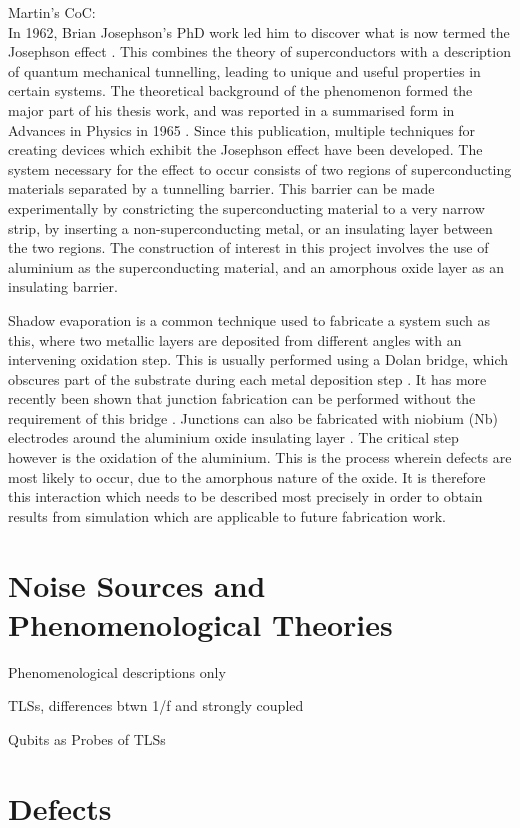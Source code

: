 Martin's CoC:\\
In 1962, Brian Josephson’s PhD work led him to discover what is now termed the Josephson effect \cite{Josephson1962}.
This combines the theory of superconductors with a description of quantum mechanical tunnelling, leading to unique and useful properties in certain systems.
The theoretical background of the phenomenon formed the major part of his thesis work, and was reported in a summarised form in Advances in Physics in 1965 \cite{Josephson1965}.
Since this publication, multiple techniques for creating devices which exhibit the Josephson effect have been developed.
The system necessary for the effect to occur consists of two regions of superconducting materials separated by a tunnelling barrier.
This barrier can be made experimentally by constricting the superconducting material to a very narrow strip, by inserting a non-superconducting metal, or an insulating layer between the two regions.
The construction of interest in this project involves the use of aluminium as the superconducting material, and an amorphous oxide layer as an insulating barrier.

Shadow evaporation is a common technique used to fabricate a system such as this, where two metallic layers are deposited from different angles with an intervening oxidation step.
This is usually performed using a Dolan bridge, which obscures part of the substrate during each metal deposition step \cite{Dolan1977}.
It has more recently been shown that junction fabrication can be performed without the requirement of this bridge \cite{Lecocq2011}.
Junctions can also be fabricated with niobium (Nb) electrodes around the aluminium oxide insulating layer \cite{Morohashi1987,Kohlstedt1993}.
The critical step however is the oxidation of the aluminium.
This is the process wherein defects are most likely to occur, due to the amorphous nature of the oxide.
It is therefore this interaction which needs to be described most precisely in order to obtain results from simulation which are applicable to future fabrication work.


\section{Noise Sources and Phenomenological Theories}
Phenomenological descriptions only

TLSs, differences btwn 1/f and strongly coupled

Qubits as Probes of TLSs


\section{Defects}

